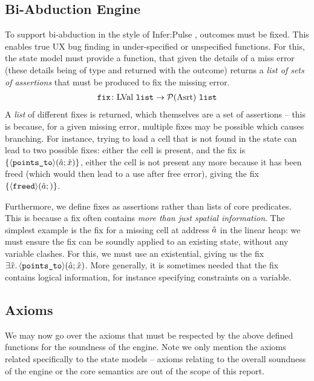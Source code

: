 \subsection{Bi-Abduction Engine}

To support bi-abduction in the style of Infer:Pulse \cite{pulse}, \Miss{} outcomes must be fixed. This enables true UX bug finding in under-specified or unspecified functions. For this, the state model must provide a \fix{} function, that given the details of a miss error (these details being of type \lvallist{} and returned with the outcome) returns a \emph{list of sets of assertions} that must be produced to fix the missing error.
\begin{align*}
	\texttt{fix} \colon \text{LVal}~\texttt{list} \rightarrow {\cal P}(\text{Asrt}) ~\texttt{list}
\end{align*}
A \emph{list} of different fixes is returned, which themselves are a set of assertions -- this is because, for a given missing error, multiple fixes may be possible which causes branching. For instance, trying to load a cell that is not found in the state can lead to two possible fixes: either the cell is present, and the fix is $\{ \left<\texttt{points\_to}\right>\!(\hat{a};\hat{x}) \}$, either the cell is not present any more because it has been freed (which would then lead to a use after free error), giving the fix $\{{\left<\texttt{freed}\right>\!(\hat{a};)}\}$.

Furthermore, we define fixes as assertions rather than lists of core predicates. This is because a fix often contains \emph{more than just spatial information}. The simplest example is the fix for a missing cell at address $\hat{a}$ in the linear heap: we must ensure the fix can be soundly applied to an existing state, without any variable clashes. For this, we must use an existential, giving us the fix $\exists \hat{x}\ldotp \left<\texttt{points\_to}\right>\!(\hat{a};\hat{x})$. More generally, it is sometimes needed that the fix contains logical information, for instance specifying constraints on a variable.

\subsection{Axioms}

We may now go over the axioms that must be respected by the above defined functions for the soundness of the engine. Note we only mention the axioms related specifically to the state models -- axioms relating to the overall soundness of the engine or the core semantics are out of the scope of this report.

